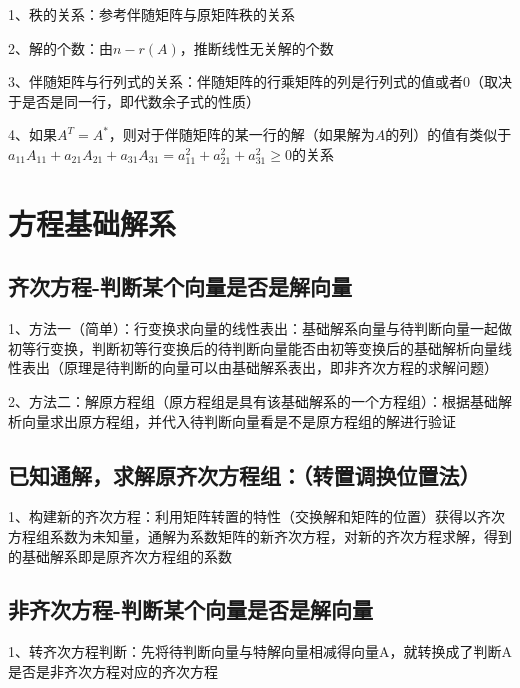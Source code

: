 1、秩的关系：参考伴随矩阵与原矩阵秩的关系

2、解的个数：由$ n - r(A) $，推断线性无关解的个数

3、伴随矩阵与行列式的关系：伴随矩阵的行乘矩阵的列是行列式的值或者0（取决于是否是同一行，即代数余子式的性质）

4、如果$ A^T=A^* $，则对于伴随矩阵的某一行的解（如果解为$ A $的列）的值有类似于$ a_{11}A_{11}+a_{21}A_{21}+a_{31}A_{31} = a_{11}^2 + a_{21}^2+a_{31}^2\ge 0 $的关系

\section{方程基础解系}



\subsection{齐次方程-判断某个向量是否是解向量}

1、方法一（简单）：行变换求向量的线性表出：基础解系向量与待判断向量一起做初等行变换，判断初等行变换后的待判断向量能否由初等变换后的基础解析向量线性表出（原理是待判断的向量可以由基础解系表出，即非齐次方程的求解问题）

2、方法二：解原方程组（原方程组是具有该基础解系的一个方程组）：根据基础解析向量求出原方程组，并代入待判断向量看是不是原方程组的解进行验证



\subsection{已知通解，求解原齐次方程组：（转置调换位置法）}

1、构建新的齐次方程：利用矩阵转置的特性（交换解和矩阵的位置）获得以齐次方程组系数为未知量，通解为系数矩阵的新齐次方程，对新的齐次方程求解，得到的基础解系即是原齐次方程组的系数



\subsection{非齐次方程-判断某个向量是否是解向量}

1、转齐次方程判断：先将待判断向量与特解向量相减得向量A，就转换成了判断A是否是非齐次方程对应的齐次方程



